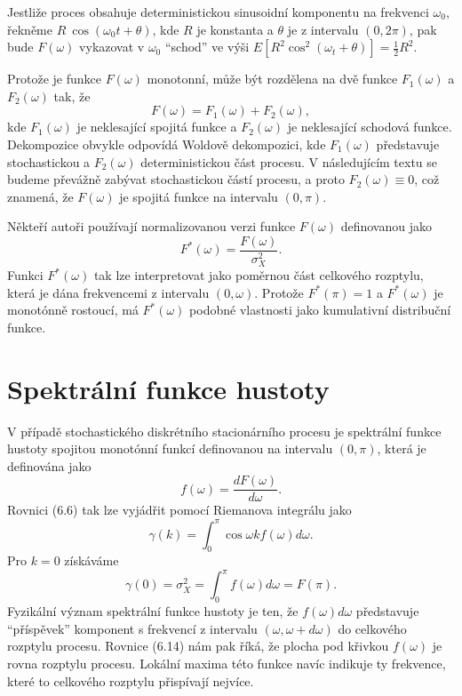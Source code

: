 Jestliže proces obsahuje deterministickou sinusoidní komponentu na frekvenci $\omega_0$, řekněme $R ~ \cos (\omega_0 t + \theta)$, kde $R$ je konstanta a $\theta$ je z intervalu $(0, 2 \pi)$, pak bude $F(\omega)$ vykazovat v $\omega_0$ ``schod'' ve výši $E[R^2 \cos^2(\omega_t + \theta)] = \frac{1}{2}R^2$.

Protože je funkce $F(\omega)$ monotonní, může být rozdělena na dvě funkce $F_1(\omega)$ a $F_2(\omega)$ tak, že
\begin{equation}
F(\omega) = F_1(\omega) + F_2(\omega),
\end{equation}
kde $F_1(\omega)$ je neklesající spojitá funkce a $F_2(\omega)$ je neklesající schodová funkce. Dekompozice obvykle odpovídá Woldově dekompozici, kde $F_1(\omega)$ představuje stochastickou a $F_2(\omega)$ deterministickou část procesu. V následujícím textu se budeme převážně zabývat stochastickou částí procesu, a proto $F_2(\omega) \equiv 0$, což znamená, že $F(\omega)$ je spojitá funkce na intervalu $(0, \pi)$.

Někteří autoři používají normalizovanou verzi funkce $F(\omega)$ definovanou jako
\begin{equation}
F^*(\omega) = \frac{F(\omega)}{\sigma_X^2}.
\end{equation}
Funkci $F^*(\omega)$ tak lze interpretovat jako poměrnou část celkového rozptylu, která je dána frekvencemi z intervalu $(0, \omega)$. Protože $F^*(\pi) = 1$ a $F^*(\omega)$ je monotónně rostoucí, má $F^*(\omega)$ podobné vlastnosti jako kumulativní distribuční funkce.

\section{Spektrální funkce hustoty}

V případě stochastického diskrétního stacionárního procesu je spektrální funkce hustoty spojitou monotónní funkcí definovanou na intervalu $(0, \pi)$, která je definována jako
\begin{equation}
f(\omega) = \frac{dF(\omega)}{d \omega}.
\end{equation}
Rovnici (6.6) tak lze vyjádřit pomocí Riemanova integrálu jako
\begin{equation}
\gamma(k) = \int_0^{\pi} \cos \omega k f(\omega) d\omega.
\end{equation}
Pro $k = 0$ získáváme
\begin{equation}
\gamma(0) = \sigma_X^2 = \int_0^{\pi} f(\omega) d \omega = F(\pi).
\end{equation}
Fyzikální význam spektrální funkce hustoty je ten, že $f(\omega) d \omega$ představuje ``příspěvek'' komponent s frekvencí z intervalu $(\omega, \omega + d \omega)$ do celkového rozptylu procesu. Rovnice (6.14) nám pak říká, že plocha pod křivkou $f(\omega)$ je rovna rozptylu procesu. Lokální maxima této funkce navíc indikuje ty frekvence, které to celkového rozptylu přispívají nejvíce.

